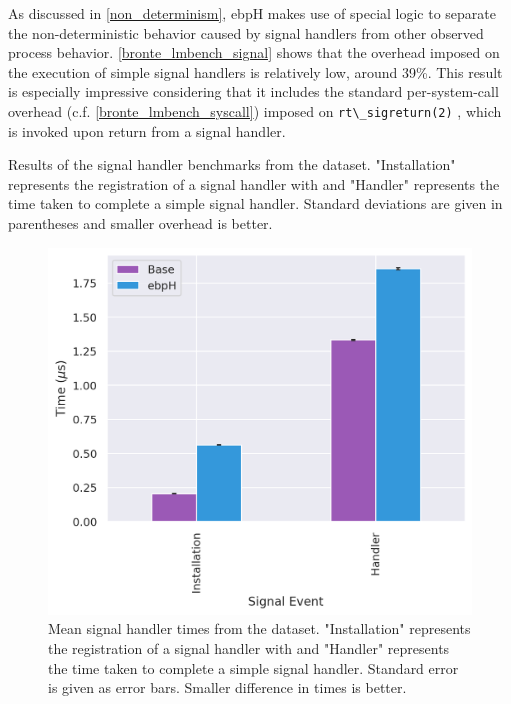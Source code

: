 \documentclass[
  12pt]{findlay}
\newcommand{\passthrough}[1]{#1}
\begin{document}
\FloatBarrier

As discussed in \autoref{non_determinism}, ebpH makes use of special
logic to separate the non-deterministic behavior caused by signal
handlers from other observed process behavior.
\autoref{bronte_lmbench_signal} shows that the overhead imposed on the
execution of simple signal handlers is relatively low, around 39\%. This
result is especially impressive considering that it includes the
standard per-system-call overhead (c.f.
\autoref{bronte_lmbench_syscall}) imposed on
\passthrough{\lstinline!rt\_sigreturn(2)!} \autocite{man_sigreturn},
which is invoked upon return from a signal handler.

\begin{table}
    \caption[Results of the signal handler benchmarks from the  dataset]{
        Results of the signal handler benchmarks from the  dataset.
        "Installation" represents the registration of a signal handler with  and
        "Handler" represents the time taken to complete a simple signal handler.
        Standard deviations are given in parentheses and smaller overhead is better.
    }
    \label{bronte_lmbench_signal}
    
\end{table}

\begin{figure}
    \caption[Mean signal handler times from the  dataset]{
        Mean signal handler times from the  dataset.
        "Installation" represents the registration of a signal handler with  and
        "Handler" represents the time taken to complete a simple signal handler.
        Standard error is given as error bars.
        Smaller difference in times is better.
    }
    \label{bronte_lmbench_signal_graph}
    \includegraphics[width=.8\textwidth]{../data/bench/bronte-lmbench/signal_times.png}
\end{figure}
\end{document}
